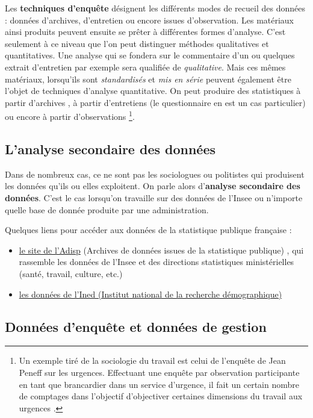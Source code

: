 \documentclass[
  french,
]{book}
\begin{document}
Les \textbf{techniques d'enquête} désignent les différents modes de recueil des données : données d'archives, d'entretien ou encore issues d'observation. Les matériaux ainsi produits peuvent ensuite se prêter à différentes formes d'analyse. C'est seulement à ce niveau que l'on peut distinguer méthodes qualitatives et quantitatives. Une analyse qui se fondera sur le commentaire d'un ou quelques extrait d'entretien par exemple sera qualifiée de \emph{qualitative}. Mais ces mêmes matériaux, lorsqu'ils sont \emph{standardisés} et \emph{mis en série} peuvent également être l'objet de techniques d'analyse quantitative. On peut produire des statistiques à partir d'archives \citep{lemercier2008}, à partir d'entretiens (le questionnaire en est un cas particulier) ou encore à partir d'observations \footnote{Un exemple tiré de la sociologie du travail est celui de l'enquête de Jean Peneff sur les urgences. Effectuant une enquête par observation participante en tant que brancardier dans un service d'urgence, il fait un certain nombre de comptages dans l'objectif d'objectiver certaines dimensions du travail aux urgences \citep{peneff1992}.}.

\hypertarget{lanalyse-secondaire-des-donnuxe9es}{%
\subsection{L'analyse secondaire des données}\label{lanalyse-secondaire-des-donnuxe9es}}

Dans de nombreux cas, ce ne sont pas les sociologues ou politistes qui produisent les données qu'ils ou elles exploitent. On parle alors d'\textbf{analyse secondaire des données}. C'est le cas lorsqu'on travaille sur des données de l'Insee ou n'importe quelle base de donnée produite par une administration.

Quelques liens pour accéder aux données de la statistique publique française :

\begin{itemize}
\item
  \href{http://www.progedo-adisp.fr/}{le site de l'Adisp} (Archives de données issues de la statistique publique) , qui rassemble les données de l'Insee et des directions statistiques ministérielles (santé, travail, culture, etc.)
\item
  \href{http://nesstar.ined.fr/webview/}{les données de l'Ined (Institut national de la recherche démographique)}
\end{itemize}

\hypertarget{donnuxe9es-denquuxeate-et-donnuxe9es-de-gestion}{%
\subsection{Données d'enquête et données de gestion}\label{donnuxe9es-denquuxeate-et-donnuxe9es-de-gestion}}
\end{document}
